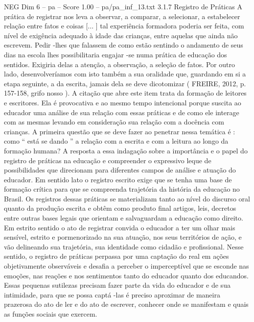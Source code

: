\begin{textsample}{NEG Dim 6 – pa – Score 1.00 – pa/pa\_inf\_13.txt}  \label{ex:f6_neg_225}
3.1.7 Registro de Práticas A prática de registrar nos leva a observar, a comparar, a selecionar, a estabelecer relação entre fatos e coisas [... ] tal experiência formadora poderia ser feita, com nível de exigência adequado à idade das crianças, entre aquelas que ainda não escrevem.
Pedir -lhes que falassem de como estão sentindo o andamento de seus dias na escola lhes possibilitaria engajar -se numa prática de educação dos sentidos.
Exigiria delas a atenção, a observação, a seleção de fatos.
Por outro lado, desenvolveríamos com isto também a sua oralidade que, guardando em si a etapa seguinte, a da escrita, jamais dela se deve dicotomizar ( FREIRE, 2012, p. 157-158, grifo nosso ).
A citação que abre este item trata da formação de leitores e escritores.
Ela é provocativa e ao mesmo tempo intencional porque suscita ao educador uma análise de sua relação com essas práticas e de como ele interage com as mesmas levando em consideração sua relação com a docência com crianças.
A primeira questão que se deve fazer ao penetrar nessa temática é : como “ está se dando ” a relação com a escrita e com a leitura ao longo da formação humana?
A resposta a essa indagação sobre a importância e o papel do registro de práticas na educação e compreender o expressivo leque de possibilidades que direcionam para diferentes campos de análise e atuação do educador.
Em sentido lato o registro escrito exige que se tenha uma base de formação crítica para que se compreenda trajetória da história da educação no Brasil.
Os registros dessas práticas se materializam tanto ao nível do discurso oral quanto da produção escrita e obtêm como produto final artigos, leis, decretos entre outras bases legais que orientam e salvaguardam a educação como direito.
Em estrito sentido o ato de registrar convida o educador a ter um olhar mais sensível, estrito e pormenorizado na sua atuação, nos seus territórios de ação, e vão delineando sua trajetória, sua identidade como cidadão e profissional.
Nesse sentido, o registro de práticas perpassa por uma captação do real em ações objetivamente observáveis e desafia a perceber o imperceptível que se esconde nas emoções, nas reações e nos sentimentos tanto do educador quanto dos educandos.
Essas pequenas sutilezas precisam fazer parte da vida do educador e de sua intimidade, para que se possa captá -las é preciso aproximar de maneira prazerosa do ato de ler e do ato de escrever, conhecer onde se manifestam e quais as funções sociais que exercem.

\end{textsample}
